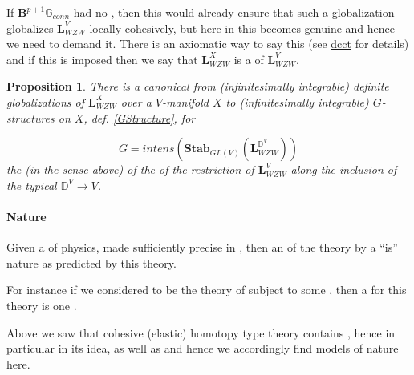 \documentclass[12pt,titlepage]{article}
\theoremstyle{plain}
\newtheorem{prop}{Proposition}
\theoremstyle{definition}
\theoremstyle{remark}
\begin{document}
If $\mathbf{B}^{p+1}\mathbb{G}_{conn}$ had no , then this would already ensure that such a globalization globalizes $\mathbf{L}_{WZW}^V$ locally cohesively, but here in  this  becomes genuine  and hence we need to demand it. There is an axiomatic way to say this (see \hyperlink{dcct}{dcct} for details) and if this is imposed then we say that $\mathbf{L}_{WZW}^X$ is a \emph{} of $\mathbf{L}_{WZW}^V$.

\begin{prop}
\label{DefiniteGlobalizationsToGStructure}\hypertarget{DefiniteGlobalizationsToGStructure}{}
There is a canonical  from (infinitesimally integrable) definite globalizations of $\mathbf{L}_{WZW}^X$ over a $V$-manifold $X$ to (infinitesimally integrable) $G$-structures on $X$, def. \ref{GStructure}, for

\begin{displaymath}
G = intens(\mathbf{Stab}_{GL(V)}(\mathbf{L}_{WZW}^{\mathbb{D}^V}))
\end{displaymath}
the  (in the sense \hyperlink{IntensiveExtensive}{above}) of the  of the restriction of $\mathbf{L}_{WZW}^V$ along the inclusion of the typical  $\mathbb{D}^V \to V$.

\end{prop}
\hypertarget{nature}{}\paragraph*{{Nature}}\label{nature}

Given a  of physics, made sufficiently precise in , then an  of the theory by a  ``is'' nature as predicted by this theory.

For instance if we considered  to be the theory of  subject to some , then a  for this theory is one  .

Above we saw that cohesive (elastic) homotopy type theory contains , hence in particular  in its idea, as well as  and hence we accordingly find models of nature here.
\end{document}
